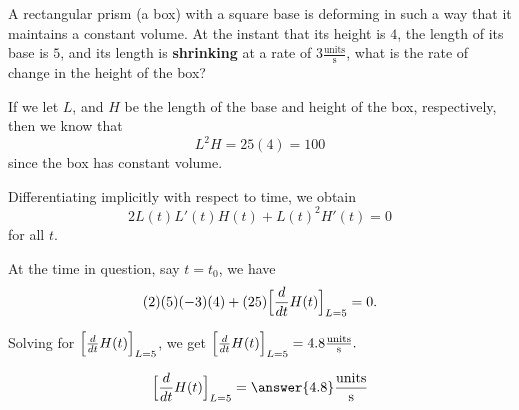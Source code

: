 \documentclass{ximera}
\author{Steven Gubkin\and Nela Lakos}
\begin{document}
\begin{exercise}

A rectangular prism (a box) with a square base is deforming in such a way that it maintains a
constant volume.  At the instant that its height is $4$, 
 the  length  of its base is $5$, and  its length is \textbf{shrinking} at a rate of $3
\frac{\textrm{units}}{\textrm{s}}$, 
 what is the rate of
change in the height of the box?

\begin{hint}
If we let $L$, and $H$ be the length of the base and height of the
box, respectively, then we know that
\[
L^2H = 25(4) = 100
\]
since the box has constant volume.
\end{hint}

\begin{hint}	
  Differentiating implicitly with respect to time, we obtain
\[
2L(t)L'(t)H(t)+L(t)^2H'(t) = 0
\]
for all $t$.
\end{hint}

\begin{hint}
  At the time in question, say $t = t_0$, we have
\[
(2)(5)(-3)(4)+(25)\Bigl[\frac{d}{dt}H(t)\Bigr]_{L=5} = 0.
\]
\end{hint}

\begin{hint}	
  Solving for $\Bigl[\frac{d}{dt}H(t)\Bigr]_{L=5}$, we get $\Bigl[\frac{d}{dt}H(t)\Bigr]_{L=5} =4.8\frac{\textrm{units}}{\textrm{s}}.$
\end{hint}

\begin{prompt}
  \[
\Bigl[\frac{d}{dt}H(t)\Bigr]_{L=5} = \answer{4.8}\frac{\textrm{units}}{\textrm{s}}
  \]
\end{prompt}

\end{exercise}
\end{document}

